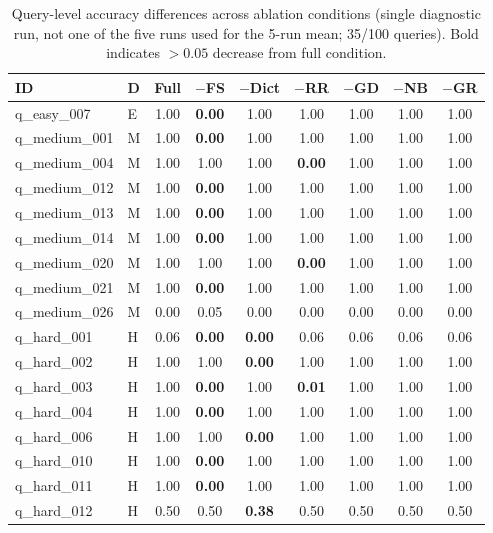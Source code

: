 \documentclass{npj-compt.mater}
\begin{document}
\begin{table}[htbp]
\centering
\caption{Query-level accuracy differences across ablation conditions (single diagnostic run, not one of the five runs used for the 5-run mean; 35/100 queries). Bold indicates $> 0.05$ decrease from full condition.}
\label{tab:sup_ablation_diff}
\scriptsize
\begin{tabular}{@{}llccccccc@{}}
  \toprule
  ID & D & Full & $-$FS & $-$Dict & $-$RR & $-$GD & $-$NB & $-$GR \\
  \midrule
    q\_easy\_007 & E & 1.00 & \textbf{0.00} & 1.00 & 1.00 & 1.00 & 1.00 & 1.00 \\
    q\_medium\_001 & M & 1.00 & \textbf{0.00} & 1.00 & 1.00 & 1.00 & 1.00 & 1.00 \\
    q\_medium\_004 & M & 1.00 & 1.00 & 1.00 & \textbf{0.00} & 1.00 & 1.00 & 1.00 \\
    q\_medium\_012 & M & 1.00 & \textbf{0.00} & 1.00 & 1.00 & 1.00 & 1.00 & 1.00 \\
    q\_medium\_013 & M & 1.00 & \textbf{0.00} & 1.00 & 1.00 & 1.00 & 1.00 & 1.00 \\
    q\_medium\_014 & M & 1.00 & \textbf{0.00} & 1.00 & 1.00 & 1.00 & 1.00 & 1.00 \\
    q\_medium\_020 & M & 1.00 & 1.00 & 1.00 & \textbf{0.00} & 1.00 & 1.00 & 1.00 \\
    q\_medium\_021 & M & 1.00 & \textbf{0.00} & 1.00 & 1.00 & 1.00 & 1.00 & 1.00 \\
    q\_medium\_026 & M & 0.00 & 0.05 & 0.00 & 0.00 & 0.00 & 0.00 & 0.00 \\
    q\_hard\_001 & H & 0.06 & \textbf{0.00} & \textbf{0.00} & 0.06 & 0.06 & 0.06 & 0.06 \\
    q\_hard\_002 & H & 1.00 & 1.00 & \textbf{0.00} & 1.00 & 1.00 & 1.00 & 1.00 \\
    q\_hard\_003 & H & 1.00 & \textbf{0.00} & 1.00 & \textbf{0.01} & 1.00 & 1.00 & 1.00 \\
    q\_hard\_004 & H & 1.00 & \textbf{0.00} & 1.00 & 1.00 & 1.00 & 1.00 & 1.00 \\
    q\_hard\_006 & H & 1.00 & 1.00 & \textbf{0.00} & 1.00 & 1.00 & 1.00 & 1.00 \\
    q\_hard\_010 & H & 1.00 & \textbf{0.00} & 1.00 & 1.00 & 1.00 & 1.00 & 1.00 \\
    q\_hard\_011 & H & 1.00 & \textbf{0.00} & 1.00 & 1.00 & 1.00 & 1.00 & 1.00 \\
    q\_hard\_012 & H & 0.50 & 0.50 & \textbf{0.38} & 0.50 & 0.50 & 0.50 & 0.50 \\

\end{tabular}
\end{table}
\end{document}
